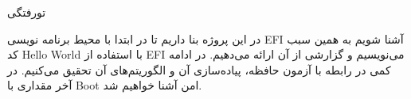 





‌تورفتگی

در این پروژه بنا داریم تا در ابتدا با محیط برنامه نویسی EFI آشنا شویم به همین سبب کد Hello World با استفاده از EFI می‌نویسیم و گزارشی از آن ارائه می‌دهیم. در ادامه کمی در رابطه با آزمون حافظه، پیاده‌سازی آن و الگوریتم‌های آن تحقیق می‌کنیم. در آخر مقداری با Boot امن آشنا خواهیم شد.
